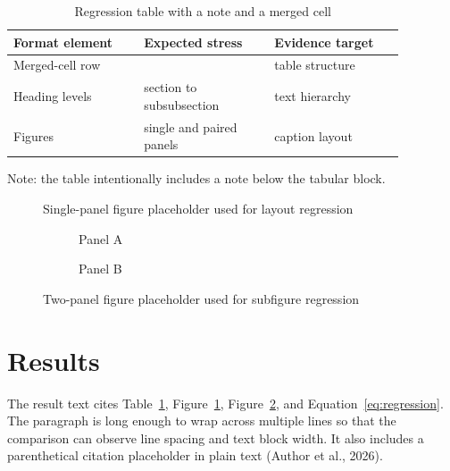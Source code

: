 \begin{table}[htbp]
\centering
\caption{Regression table with a note and a merged cell}
\label{tab:regression}
\begin{threeparttable}
\begin{tabular}{@{}p{0.29\linewidth}@{}p{0.29\linewidth}@{}p{0.29\linewidth}@{}}
\toprule
Format element & Expected stress & Evidence target \\
\midrule
\multicolumn{2}{l}{Merged-cell row} & table structure \\
Heading levels & section to subsubsection & text hierarchy \\
Figures & single and paired panels & caption layout \\
\bottomrule
\end{tabular}
\begin{tablenotes}
\small
\item Note: the table intentionally includes a note below the tabular block.
\end{tablenotes}
\end{threeparttable}
\end{table}

\begin{figure}[htbp]
\centering
\fbox{\rule{0pt}{35mm}\rule{0.82\linewidth}{0pt}}
\caption{Single-panel figure placeholder used for layout regression}
\label{fig:single}
\end{figure}

\providecommand{\tempTwoTexPairedFigure}{%
\begin{figure}[htbp]
\centering
\begin{subfigure}{0.46\linewidth}
\centering
\fbox{\rule{0pt}{25mm}\rule{0.82\linewidth}{0pt}}
\caption{Panel A}
\end{subfigure}\hfill
\begin{subfigure}{0.46\linewidth}
\centering
\fbox{\rule{0pt}{25mm}\rule{0.82\linewidth}{0pt}}
\caption{Panel B}
\end{subfigure}
\caption{Two-panel figure placeholder used for subfigure regression}
\label{fig:paired}
\end{figure}%
}
\tempTwoTexPairedFigure

\section{Results}
The result text cites Table~\ref{tab:regression}, Figure~\ref{fig:single}, Figure~\ref{fig:paired}, and Equation~\ref{eq:regression}. The paragraph is long enough to wrap across multiple lines so that the comparison can observe line spacing and text block width. It also includes a parenthetical citation placeholder in plain text (Author et al., 2026).


